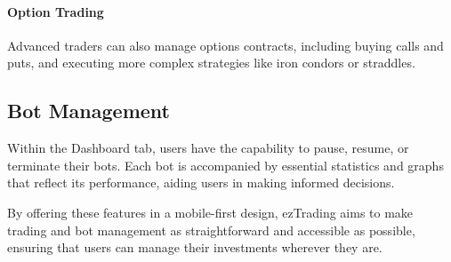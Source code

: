 \paragraph{Option Trading}
Advanced traders can also manage options contracts, including buying calls and puts, and executing more complex strategies like iron condors or straddles.


\subsection{Bot Management}
\label{subsec:bot-management}

Within the Dashboard tab, users have the capability to pause, resume, or terminate their bots. Each bot is accompanied by essential statistics and graphs that reflect its performance, aiding users in making informed decisions.

By offering these features in a mobile-first design, ezTrading aims to make trading and bot management as straightforward and accessible as possible, ensuring that users can manage their investments wherever they are.
